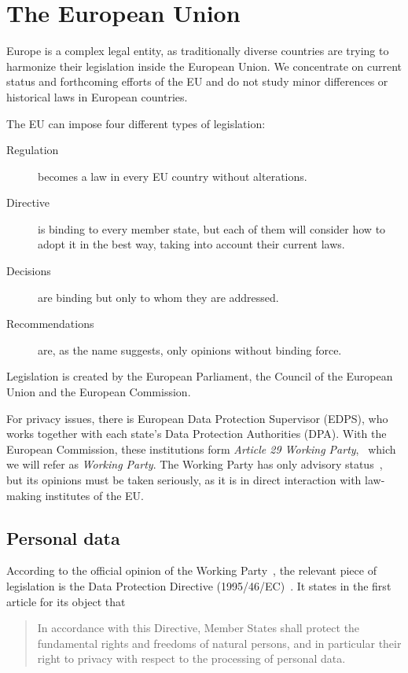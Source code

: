 \documentclass[12pt,a4paper,oneside,pdftex]{report}
\begin{document}
\section{The European Union}
\label{sec:legal_europe}

Europe is a complex legal entity, as traditionally diverse countries are trying to harmonize their legislation inside the European Union. We concentrate on current status and forthcoming efforts of the EU and do not study minor differences or historical laws in European countries.

The EU can impose four different types of legislation:~\cite{lisbon_288}
\begin{description}
     \item[Regulation] becomes a law in every EU country without alterations.
     \item[Directive] is binding to every member state, but each of them will consider how to adopt it in the best way, taking into account their current laws.
     \item[Decisions] are binding but only to whom they are addressed.
     \item[Recommendations] are, as the name suggests, only opinions without binding force.
\end{description}

Legislation is created by the European Parliament, the Council of the European Union and the European Commission.~\cite{eu_institutions}

For privacy issues, there is European Data Protection Supervisor (EDPS), who works together with each state's Data Protection Authorities (DPA). With the European Commission, these institutions form \emph{Article 29 Working Party},~\cite{wp29_rules} which we will refer as \emph{Working Party}. The Working Party has only advisory status~\cite{wp29_rules}, but its opinions must be taken seriously, as it is in direct interaction with law-making institutes of the EU.

\subsection{Personal data}
\label{subsec:eu:personal_data}

According to the official opinion of the Working Party~\cite{wp29_185}, the relevant piece of legislation is the Data Protection Directive (1995/46/EC)~\cite{data_protection}. It states in the first article for its object that

\begin{quote}
    In accordance with this Directive, Member States shall protect the fundamental rights and freedoms of natural persons, and in particular their right to privacy with respect to the processing of personal data.
\end{quote}
\end{document}
